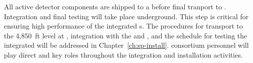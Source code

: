 \begin{comment}
The \dword{qc} of integration and installation has two main testing campaigns: one %
in the cleanroom just outside the cryostat 
and another once the \dwords{apa} are installed into the cryostat. The installation and integration team in the \dword{apa} consortium are still developing some details. 

Keeping track of all components for all \dword{apa}s at the different stages of  integration and installation requires a dedicated database for \dword{qc}. For efficient integration, a simple and practical way of tagging critical parts in the \dword{apa} is also being developed. This is described in Chapter~\ref{ch:sp-install}. \fixme{anne added ref}

The \dword{qa} for integration and installation relies heavily on the \dword{pdsp} experience, and at this point, no dedicated \dword{qa} protocol is developed. The full development of the protocol is being handled by the installation and integration team in the \dword{apa} consortium. 

\subsubsection{Quality Control at the Underground Integration Facility}
\label{sec:fdsp-apa-install-qc_if}
\end{comment}

All active detector components are shipped to a  before final tranport to . Integration and final testing will take place underground. %
This step is critical for ensuring high performance of the integrated s. The procedures for  transport to the 4,850~ft level at , integration with the  and , and the schedule for testing the integrated  will be addressed in %
Chapter~\ref{ch:sp-install}.  consortium personnel will play direct and key roles throughout the integration and installation activities.  %



